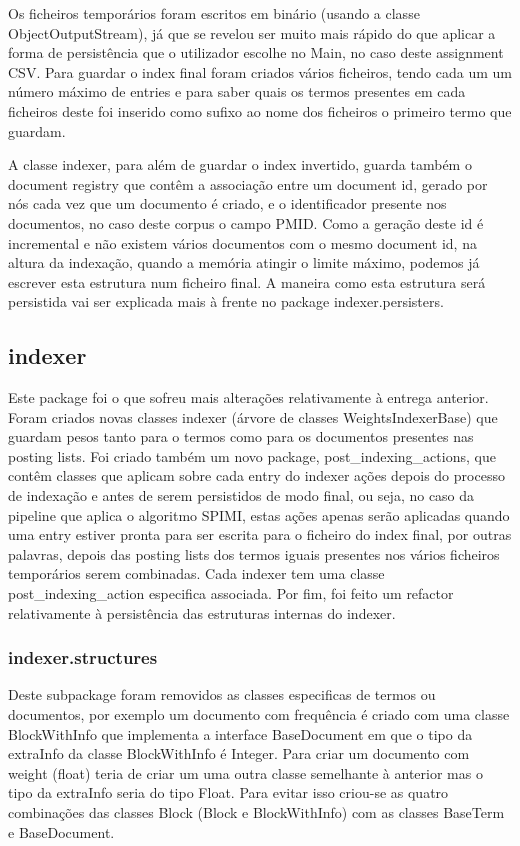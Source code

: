\documentclass[12pt]{article}
\begin{document}
Os ficheiros temporários foram escritos em binário (usando a classe
ObjectOutputStream), já que se revelou ser muito mais rápido do que
aplicar a forma de persistência que o utilizador escolhe no Main, no
caso deste assignment CSV. Para guardar o index final foram criados
vários ficheiros, tendo cada um um número máximo de entries e para
saber quais os termos presentes em cada ficheiros deste foi inserido
como sufixo ao nome dos ficheiros o primeiro termo que guardam.

A classe indexer, para além de guardar o index invertido, guarda também
o document registry que contêm a associação entre um document id, gerado por nós cada vez que um documento é criado, e o identificador presente nos
documentos, no caso deste corpus o campo PMID. Como a geração deste id é incremental e não existem vários documentos com o mesmo document id, na
altura da indexação, quando a memória atingir o limite máximo, podemos
já escrever esta estrutura num ficheiro final. A maneira como esta
estrutura será persistida vai ser explicada mais à frente no package
indexer.persisters.

\subsection{indexer}

Este package foi o que sofreu mais alterações relativamente à entrega
anterior. Foram criados novas classes indexer (árvore de classes
WeightsIndexerBase) que guardam pesos tanto para o termos como
para os documentos presentes nas posting lists. Foi criado também
um novo package, post\_indexing\_actions, que contêm classes que
aplicam sobre cada entry do indexer ações depois do processo de
indexação e antes de serem persistidos de modo final, ou seja, no
caso da pipeline que aplica o algoritmo SPIMI, estas ações apenas
serão aplicadas quando uma entry estiver pronta para ser escrita
para o ficheiro do index final, por outras palavras, depois das
posting lists dos termos iguais presentes nos vários ficheiros
temporários serem combinadas. Cada indexer tem uma classe
post\_indexing\_action especifica associada. Por fim, foi feito
um refactor relativamente à persistência das estruturas internas
do indexer.

\subsubsection{indexer.structures}

Deste subpackage foram removidos as classes especificas de termos ou
documentos, por exemplo um documento com frequência é criado com uma
classe BlockWithInfo que implementa a interface BaseDocument em que o
tipo da extraInfo da classe BlockWithInfo é Integer. Para criar um
documento com weight (float) teria de criar um uma outra classe
semelhante à anterior mas o tipo da extraInfo seria do tipo Float.
Para evitar isso criou-se as quatro combinações das classes Block
(Block e BlockWithInfo) com as classes BaseTerm e BaseDocument.
\end{document}
